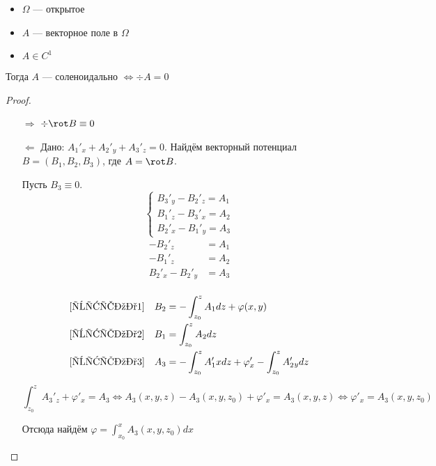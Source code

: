 \begin{theorem}[Пуанкаре\({}'\)]\itemfix
    \begin{itemize}
        \item \(\Omega\) --- открытое \?
        \item \(A\) --- векторное поле в \(\Omega\)
        \item \(A \in C^1\)
    \end{itemize}

    Тогда \(A\) --- соленоидально \(\Leftrightarrow \div A = 0\)
\end{theorem}
\begin{proof}
    \begin{itemize}
        \item [\( \Rightarrow \)] \(\div \rot B \equiv 0\)
        \item [\( \Leftarrow \)] Дано: \(A_{1}'{}_x + A_2'{}_y + A_3'{}_z = 0\). Найдём векторный потенциал \(B = (B_1, B_2, B_3)\), где \(A = \rot B\).

              Пусть \(B_3 \equiv 0\).
              \[\begin{cases} B_3'{}_y - B_2'{}_z = A_1 \\ B_1'{}_z - B_3'{}_x = A_2 \\ B_2'{}_x - B_1'{}_y = A_3 \end{cases}\]
              \begin{align}
                  - B_2'{}_z          & = A_1 \label{штука1} \\
                  - B_1'{}_z          & = A_2 \label{штука2} \\
                  B_2'{}_x - B_2'{}_y & = A_3 \label{штука3} \\
              \end{align}

              \begin{align*}
                  \eqref{штука1} \quad B_2 & = - \int_{z_0}^z A_1 dz + \varphi(x, y)                           \\
                  \eqref{штука2} \quad B_1 & = \int_{z_0}^z A_2 dz                                             \\
                  \eqref{штука3} \quad A_3 & =  -\int_{z_0}^z A_1'x dz + \varphi'_x - \int_{z_0}^z A_2'{}_y dz \\
              \end{align*}

              \[\int_{z_0}^z A_3'{}_z + \varphi'_x = A_3 \Leftrightarrow A_3(x, y, z) - A_3(x, y, z_0) + \varphi'_x = A_3(x, y, z) \Leftrightarrow \varphi'_x = A_3(x, y, z_0)\]

              Отсюда найдём \(\varphi = \int_{x_0}^x A_3(x, y, z_0)dx\)
    \end{itemize}
\end{proof}

